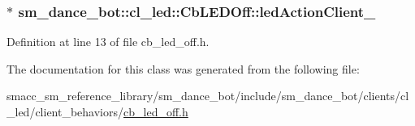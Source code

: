 \subsubsection[{\texorpdfstring{led\+Action\+Client\+\_\+}{ledActionClient_}}]{$\ast$ sm\+\_\+dance\+\_\+bot\+::cl\+\_\+led\+::\+Cb\+L\+E\+D\+Off\+::led\+Action\+Client\+\_\+}\hypertarget{classsm__dance__bot_1_1cl__led_1_1CbLEDOff_a338a86c573b1b9c9cc4af9459145d68e}{}\label{classsm__dance__bot_1_1cl__led_1_1CbLEDOff_a338a86c573b1b9c9cc4af9459145d68e}


Definition at line 13 of file cb\+\_\+led\+\_\+off.\+h.



The documentation for this class was generated from the following file\+:\begin{DoxyCompactItemize}
\item 
smacc\+\_\+sm\+\_\+reference\+\_\+library/sm\+\_\+dance\+\_\+bot/include/sm\+\_\+dance\+\_\+bot/clients/cl\+\_\+led/client\+\_\+behaviors/\hyperlink{cb__led__off_8h}{cb\+\_\+led\+\_\+off.\+h}\end{DoxyCompactItemize}
